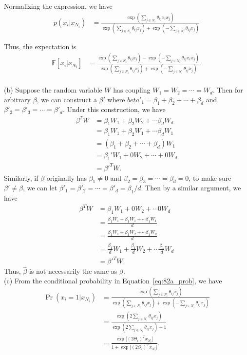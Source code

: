 \documentclass{article}
\newcommand{\qeds}{\hfill\qedsymbol}
\begin{document}
Normalizing the expression, we have
\begin{align}
p(x_i | x_{N_i}) &= \frac{\exp\left(\sum_{j\in N_i}\theta_{ij} x_i x_j\right)}
{\exp\left(\sum_{j\in N_i}\theta_{ij} x_j\right) +
\exp\left(-\sum_{j\in N_i}\theta_{ij} x_j\right)} \label{eq:82a_prob}
\end{align}

Thus, the expectation is
\begin{align}
	\mathbb{E}[x_i | x_{N_i}] &= \frac{
\exp\left(\sum_{j\in N_i}\theta_{ij}x_j\right) - 
\exp\left(-\sum_{j\in N_i}\theta_{ij} x_i x_j\right)}
{\exp\left(\sum_{j\in N_i}\theta_{ij} x_j\right) +
\exp\left(-\sum_{j\in N_i}\theta_{ij} x_j\right)}. \label{eq:82a_exp}
\end{align}
\\

\noindent
(b)
%
Suppose the random variable $W$ has coupling $W_1 = W_2 = \cdots = W_d$. Then for arbitrary $\beta$,
we can construct a $\beta'$ where $beta'_1 = \beta_1 + \beta_2 + \cdots + \beta_d$ and
$\beta'_2 = \beta'_3 = \cdots = \beta'_d$. Under this construction, we have
\begin{align*}
	\beta^T W &= \beta_1W_1 + \beta_2W_2 + \cdots \beta_d W_d\\
	&= \beta_1W_1 + \beta_2W_1 + \cdots \beta_d W_1 \\
	&= (\beta_1 + \beta_2 + \cdots + \beta_d)W_1 \\
	& = \beta_1' W_1 + 0W_2 + \cdots + 0W_d\\
	& = \beta'^T W.
\end{align*}
Similarly, if $\beta$ originally has $\beta_1 \neq 0$ and $\beta_2 = \beta_3 = \cdots =\beta_d = 0$, 
to make sure $\beta' \neq \beta$, we can let $\beta'_1 = \beta'_2 = \cdots = \beta'_d = \beta_1 / d$.
Then by a similar argument, we have
\begin{align*}
	\beta^T W &= \beta_1W_1 + 0W_2 + \cdots 0 W_d\\
	&= \frac{\beta_1W_1 + \beta_1W_1 + \cdots \beta_1 W_1}{d} \\
	&= \frac{\beta_1W_1 + \beta_1W_2 + \cdots \beta_1 W_d}{d} \\
	& = \frac{\beta_1}{d}W_1 + \frac{\beta_1}{d}W_2 + \cdots \frac{\beta_1}{d} W_d\\
	& = \beta'^T W.
\end{align*}
Thus, $\hat{\beta}$ is not necessarily the same as $\beta$.\qeds
\\

\noindent
(c) From the conditional probability in Equation~\eqref{eq:82a_prob}, we have
\begin{align*}
	\Pr(x_i=1|x_{N_i}) &= \frac{\exp\left(\sum_{j\in N_i}\theta_{ij} x_j\right)}
{\exp\left(\sum_{j\in N_i}\theta_{ij} x_j\right) +
\exp\left(-\sum_{j\in N_i}\theta_{ij} x_j\right)} \\
	&=
\frac{\exp\left(2\sum_{j\in N_i}\theta_{ij} x_j\right)}
{\exp\left(2\sum_{j\in N_i}\theta_{ij} x_j\right) +
1}\\
&= 
\frac{\exp\big[(2\Theta_i)^T x_{N_i}\big]}
{1 + \exp\big[(2\Theta_i)^T x_{N_i}\big]}.
\end{align*}
\end{document}
